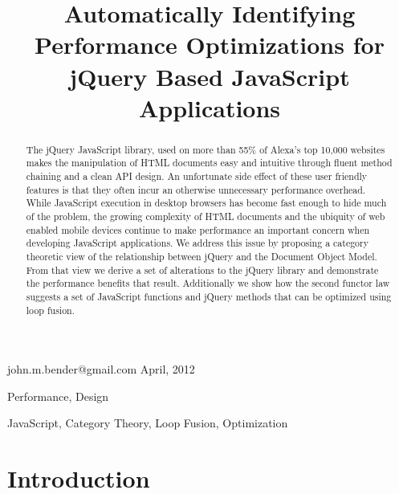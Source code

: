 \documentclass[preprint]{sigplanconf}
\begin{document}
\copyrightdata{[to be supplied]}


\title{Automatically Identifying Performance Optimizations for jQuery Based JavaScript Applications}

           {john.m.bender@gmail.com}
           {April, 2012}

\maketitle

\begin{abstract}
The jQuery JavaScript library, used on more than 55\% of Alexa's top 10,000 websites \cite{bib:usage} makes the manipulation of HTML documents easy and intuitive through fluent method chaining and a clean API design. An unfortunate side effect of these user friendly features is that they often incur an otherwise unnecessary performance overhead. While JavaScript execution in desktop browsers has become fast enough to hide much of the problem, the growing complexity of HTML documents and the ubiquity of web enabled mobile devices continue to make performance an important concern when developing JavaScript applications. We address this issue by proposing a category theoretic view of the relationship between jQuery and the Document Object Model. From that view we derive a set of alterations to the jQuery library and demonstrate the performance benefits that result. Additionally we show how the second functor law suggests a set of JavaScript functions and jQuery methods that can be optimized using loop fusion.
\end{abstract}


\terms
Performance, Design

\keywords
JavaScript, Category Theory, Loop Fusion, Optimization

\section{Introduction}
\end{document}
